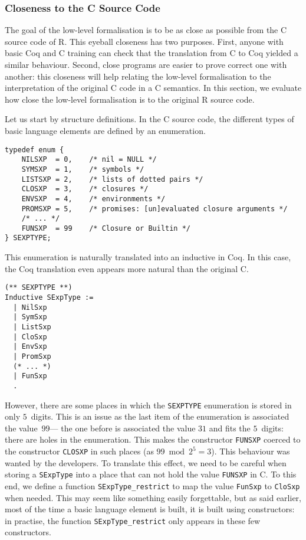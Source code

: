 \documentclass{article}
\newcommand\Coq{Coq}
\newcommand\R{R}
\newcommand\Cn{C}
\begin{document}
\subsubsection{Closeness to the \Cn{} Source Code}
\label{sec:closeness}

The goal of the low-level formalisation is to be as close as possible
from the \Cn{} source code of \R{}.
This eyeball closeness has two purposes.
First, anyone with basic \Coq{} and \Cn{} training
can check that the translation from \Cn{} to \Coq{} yielded
a similar behaviour.
Second, close programs are easier to prove correct one with another:
this closeness will help relating the low-level formalisation
to the interpretation of the original \Cn{} code in a \Cn{} semantics.
In this section, we evaluate how close the low-level formalisation
is to the original \R{} source code.

Let us start by structure definitions.
In the \Cn{} source code, the different types of basic language elements
are defined by an enumeration.
\begin{verbatim}
typedef enum {
    NILSXP  = 0,    /* nil = NULL */
    SYMSXP  = 1,    /* symbols */
    LISTSXP = 2,    /* lists of dotted pairs */
    CLOSXP  = 3,    /* closures */
    ENVSXP  = 4,    /* environments */
    PROMSXP = 5,    /* promises: [un]evaluated closure arguments */
    /* ... */
    FUNSXP  = 99    /* Closure or Builtin */
} SEXPTYPE;
\end{verbatim}
This enumeration is naturally translated into an inductive in \Coq{}.
In this case,
the \Coq{} translation even appears more natural than the original \Cn{}.
\begin{verbatim}
(** SEXPTYPE **)
Inductive SExpType :=
  | NilSxp
  | SymSxp
  | ListSxp
  | CloSxp
  | EnvSxp
  | PromSxp
  (* ... *)
  | FunSxp
  .
\end{verbatim}
However, there are some places in which the \texttt{SEXPTYPE}
enumeration is stored in only \(5\)~digits.
This is an issue as the last item of the enumeration
is associated the value~\(99\)—%
the one before is associated the value \(31\) and fits the \(5\)~digits:
there are holes in the enumeration.
This makes the constructor \texttt{FUNSXP} coerced
to the constructor \texttt{CLOSXP} in such places
(as \(99 \bmod 2^5 = 3\)).
This behaviour was wanted by the developers.
To translate this effect,
we need to be careful when storing a \texttt{SExpType}
into a place that can not hold the value \texttt{FUNSXP} in \Cn{}.
To this end, we define a function
\texttt{SExpType_restrict} to map the value
\texttt{FunSxp} to \texttt{CloSxp} when needed.
This may seem like something easily forgettable,
but as said earlier, most of the time a basic language element is built,
it is built using constructors:
in practise, the function \texttt{SExpType_restrict}
only appears in these few constructors.
\end{document}
